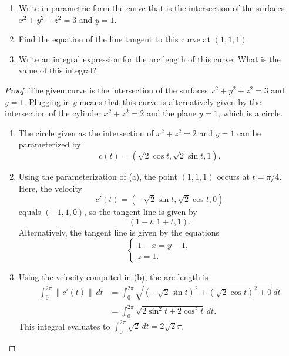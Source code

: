 \documentclass[openany]{book}
\begin{document}
\begin{prob}[36]
    \begin{enumerate}
        \item[(a)] Write in parametric form the curve that is the intersection of the surfaces \( x^2 + y^2 + z^2 = 3 \) and \( y = 1 \).
        \item[(b)]  Find the equation of the line tangent to this curve at \((1, 1, 1)\).
        \item[(c)] Write an integral expression for the arc length of this curve. What is the value of this integral?
    \end{enumerate}
\end{prob}
\begin{proof}
    The given curve is the intersection of the surfaces $x^2+y^2+z^2=3$ and $y=1$. Plugging in $y$ means that this curve is alternatively given by the intersection of the cylinder $x^2+z^2=2$ and the plane $y=1$, which is a circle.
    \begin{enumerate}
        \item[(a)] The circle given as the intersection of $x^2+z^2=2$ and $y=1$ can be parameterized by
        \[c(t)=\left(\sqrt2\cos t,\sqrt2\sin t,1\right).\]
        \item[(b)] Using the parameterization of (a), the point $(1,1,1)$ occurs at $t=\pi/4$. Here, the velocity
        \[c'(t)=\left(-\sqrt2\sin t,\sqrt2\cos t,0\right)\]
        equals $(-1,1,0)$, so the tangent line is given by
        \[(1-t,1+t,1).\]
        Alternatively, the tangent line is given by the equations
        \[\begin{cases}1-x=y-1,\\ z=1.\end{cases}\]
        \item[(c)] Using the velocity computed in (b), the arc length is
        \begin{align*}
            \int_0^{2\pi}\lVert c'(t)\rVert\,dt &= \int_0^{2\pi}\sqrt{\left(-\sqrt2\sin t\right)^2+\left(\sqrt2\cos t\right)^2+0}\,dt \\
            &= \int_0^{2\pi}\sqrt{2\sin^2t+2\cos^2t}\,dt.
        \end{align*}
        This integral evaluates to $\int_0^{2\pi}\sqrt2\,dt=2\sqrt2\pi$.
        \qedhere
    \end{enumerate}
\end{proof}
\end{document}
